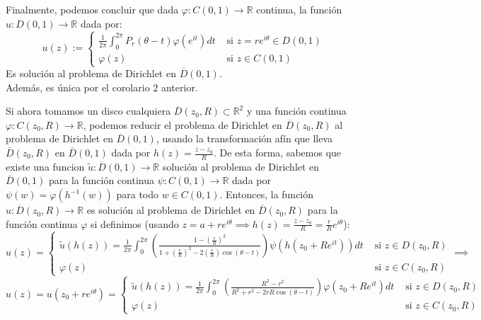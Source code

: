 Finalmente, podemos concluir que dada $\varphi: C(0,1) \to \mathbb{R}$ continua, la función $u:D(0,1) \to \mathbb{R}$ dada por:
\[
    u(z) := \begin{cases}
        \frac{1}{2\pi} \int_0^{2\pi} P_r(\theta - t) \varphi(e^{it}) dt & \text{ si } z = re^{i\theta} \in D(0,1) \\
        \varphi(z) & \text{ si } z \in C(0,1)
    \end{cases}
\]
Es solución al problema de Dirichlet en $\overline{D}(0,1)$.\\
Además, es única por el corolario $2$ anterior.

Si ahora tomamos un disco cualquiera $\overline{D}(z_0,R) \subset \mathbb{R}^2$ y una función continua $\varphi: C(z_0,R) \to \mathbb{R}$, podemos reducir el problema de Dirichlet en $\overline{D}(z_0,R)$ al problema de Dirichlet en $\overline{D}(0,1)$, usando la transformación afín que lleva $\overline{D}(z_0,R)$ en $\overline{D}(0,1)$ dada por $h(z) = \frac{z - z_0}{R}$. De esta forma, sabemos que existe una funcion $\widetilde{u} : \overline{D}(0,1) \to \mathbb{R}$ solución al problema de Dirichlet en $\overline{D}(0,1)$ para la función continua $\psi: C(0,1) \to \mathbb{R}$ dada por $\psi(w) = \varphi(h^{-1}(w))$ para todo $w \in C(0,1)$. Entonces, la función $u:\overline{D}(z_0,R) \to \mathbb{R}$ es solución al problema de Dirichlet en $\overline{D}(z_0,R)$ para la función continua $\varphi$ si definimos (usando $z = a + re^{i\theta} \implies h(z) = \frac{{z - z_0}}{R} = \frac{r}{R} e^{i\theta}$):
\[
    u(z) =
    \begin{cases}
        \widetilde{u}\left( h(z) \right) = 
        \frac{1}{2\pi} \int_0^{2\pi} \left( \frac{1 - \left( \frac{r}{R} \right)^2}{1 + \left( \frac{r}{R} \right)^2 - 2 \left( \frac{r}{R} \right) \cos(\theta - t)} \right) \psi \left( h(z_0 + Re^{it}) \right) dt & \text{ si } z \in D(z_0,R) \\
        \varphi(z) & \text{ si } z \in C(z_0,R)
    \end{cases} \implies
\]
\[
    u(z) = u(z_0 + r e^{i\theta}) =
    \begin{cases}
        \widetilde{u} \left( h(z) \right) = 
        \frac{1}{2\pi} \int_0^{2\pi} \left( \frac{R^2 - r^2}{R^2 + r^2 - 2rR \cos(\theta - t)} \right) \varphi(z_0 + Re^{it}) dt & \text{ si } z \in D(z_0,R) \\
        \varphi(z) & \text{ si } z \in C(z_0,R)
    \end{cases}
\]